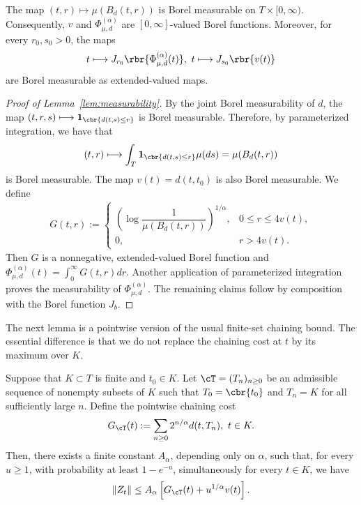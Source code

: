 \documentclass[11pt]{article}
\begin{document}
\begin{lemma}
\label{lem:measurability}
The map $(t,r)\mapsto\mu(B_d(t,r))$ is Borel measurable on
$T\times[0,\infty)$. Consequently, $v$ and
$\Phi_{\mu,d}^{(\alpha)}$ are $[0,\infty]$-valued Borel functions.
Moreover, for every $r_0,s_0>0$, the maps
\begin{align*}
t\longmapsto J_{r_0}\rbr{\Phi_{\mu,d}^{(\alpha)}(t)},\ 
t\longmapsto J_{s_0}\rbr{v(t)}
\end{align*}
are Borel measurable as extended-valued maps.
\end{lemma}

\begin{proof}[Proof of Lemma~\ref{lem:measurability}]
By the joint Borel measurability of $d$, the map $(t,r,s)\longmapsto\mathbf 1_{\cbr{d(t,s)\le r}}$
is Borel measurable. Therefore, by parameterized integration, we have that
\begin{align*}
(t,r)\longmapsto
\int_T\mathbf 1_{\cbr{d(t,s)\le r}}\mu(ds)
=\mu(B_d(t,r))
\end{align*}
is Borel measurable. The map $v(t)=d(t,t_0)$ is also Borel measurable. We
define
\begin{align*}
G(t,r)
:=
\begin{cases}
\left(\log\dfrac{1}{\mu(B_d(t,r))}\right)^{1/\alpha},
&0\le r\le4v(t),\\
0,&r>4v(t).
\end{cases}
\end{align*}
Then $G$ is a nonnegative, extended-valued Borel function and $\Phi_{\mu,d}^{(\alpha)}(t)=\int_0^\infty G(t,r)dr$.
Another application of parameterized integration proves the
measurability of $\Phi_{\mu,d}^{(\alpha)}$. The remaining claims follow
by composition with the Borel function $J_b$.
\end{proof}




The next lemma is a pointwise version of the usual finite-set chaining
bound. The essential difference is that we do not replace the chaining
cost at $t$ by its maximum over $K$.

\begin{lemma}
\label{lem:finite_set_pointwise_tail_bound}
Suppose that $K\subset T$ is finite and $t_0\in K$. Let
$\cT=(T_n)_{n\ge0}$ be an admissible sequence of nonempty subsets of $K$ such
that $T_0=\cbr{t_0}$ and $T_n=K$ for all sufficiently large $n$. Define the pointwise
chaining cost
\begin{align*}
G_{\cT}(t)
:=
\sum_{n\ge0}2^{n/\alpha}d(t,T_n),
\ t\in K.
\end{align*}
Then, there exists a finite constant $A_\alpha$, depending only on
$\alpha$, such that, for every $u\ge1$, with probability at least
$1-e^{-u}$, simultaneously for every $t\in K$, we have
\begin{align*}
\|Z_t\|
\le
A_\alpha
\left[
G_{\cT}(t)
+u^{1/\alpha}v(t)
\right].
\end{align*}
\end{lemma}
\end{document}
